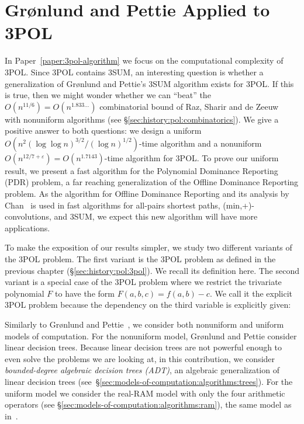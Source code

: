 \section{Gr\o nlund and Pettie Applied to 3POL}

In Paper~\ref{paper:3pol-algorithm}
we focus on the computational complexity of 3POL\@. Since 3POL contains 3SUM,
an interesting question is whether a generalization of Gr\o nlund and Pettie's
3SUM algorithm exists for 3POL\@. If this is true, then we might wonder whether
we can ``beat'' the $O(n^{11/6}) = O(n^{1.833\ldots})$ combinatorial bound of Raz,
Sharir and de Zeeuw~\cite{RSZ15} with nonuniform algorithms
(see \S\ref{sec:history:pol:combinatorics}).
%
We give a positive
answer to both questions: we design
a uniform
$O(n^2 {(\log \log n)}^{3/2} / {(\log n)}^{1/2})$-time
algorithm
and
a nonuniform
$O(n^{12/7+\varepsilon}) = O(n^{1.7143})$-time algorithm
for 3POL\@.
%
To prove our uniform result, we present a fast algorithm for the Polynomial
Dominance Reporting (PDR) problem, a far reaching generalization of the
Offline Dominance Reporting problem.
%
As the algorithm for Offline Dominance Reporting and its
analysis by Chan~\cite{Cha08} is used in fast algorithms for all-pairs shortest
paths, (min,+)-convolutions, and 3SUM, we expect this new algorithm will have
more applications.

To make the exposition of our results simpler,
we study two different variants of the 3POL problem.
The first variant is the 3POL problem as defined in the previous chapter
(\S\ref{sec:history:pol:3pol}).
We recall its definition here.
\ProblemPOLImplicit*
The second variant is a special case of the 3POL problem where we
restrict the trivariate polynomial $F$ to have the form $F(a,b,c) = f(a,b) -
c$. We call it the explicit 3POL problem because the dependency on the third
variable is explicitly given:
%


Similarly to Gr\o nlund and Pettie~\cite{GP18}, we consider both nonuniform
and uniform models of computation.
%
For the nonuniform model, Gr\o nlund and Pettie consider linear
decision trees.
%
Because linear decision trees are not powerful enough to even solve the
problems we are looking at,
in this contribution, we consider
\emph{bounded-degree algebraic decision trees (ADT)},
an algebraic generalization of linear decision trees
(see~\S\ref{sec:models-of-computation:algorithms:trees}).
%
For the uniform model we consider the real-RAM model with only the four
arithmetic operators (see \S\ref{sec:models-of-computation:algorithms:ram}),
the same model as in~\cite{GP18}.

